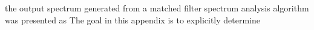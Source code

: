 

the output spectrum generated from a matched filter spectrum analysis algorithm was presented as 
The goal in this appendix is to explicitly determine
%
%